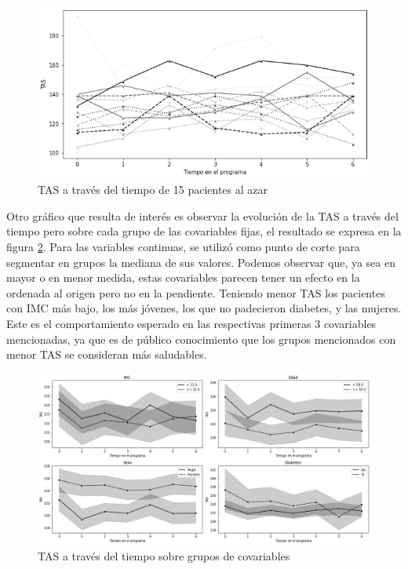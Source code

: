 \documentclass[spanish]{article}
\numberwithin{figure}{subsection}
\numberwithin{equation}{subsection}
\numberwithin{table}{subsection}
\begin{document}
\begin{figure}[H]
	\centering
	\includegraphics[scale=0.5]{img/spaghetti_plot.png}
	\caption{TAS a través del tiempo de 15 pacientes al azar}
	\label{spaghetti}
\end{figure}

Otro gráfico que resulta de interés es observar la evolución de la TAS a través
del tiempo pero sobre cada grupo de las covariables fijas, el resultado se
expresa en la figura \ref{TAS_with_covs}. Para las variables continuas, se
utilizó como punto de corte para segmentar en grupos la mediana de sus valores.
Podemos observar que, ya sea en mayor o en menor medida, estas covariables
parecen tener un efecto en la ordenada al origen pero no en la pendiente.
Teniendo menor TAS los pacientes con IMC más bajo, los más jóvenes, los que no
padecieron diabetes, y las mujeres. Este es el comportamiento esperado en las
respectivas primeras 3 covariables mencionadas, ya que es de público
conocimiento que los grupos mencionados con menor TAS se consideran más
saludables.

\begin{figure}[H]
	\centering
	\includegraphics[scale=0.4]{img/TAS_vs_tpo_with_covs.png}
	\caption{TAS a través del tiempo sobre grupos de covariables}
	\label{TAS_with_covs}
\end{figure}




\newpage
\nocite{*}
\renewcommand{\refname}{Bibliografía}

\end{document}
